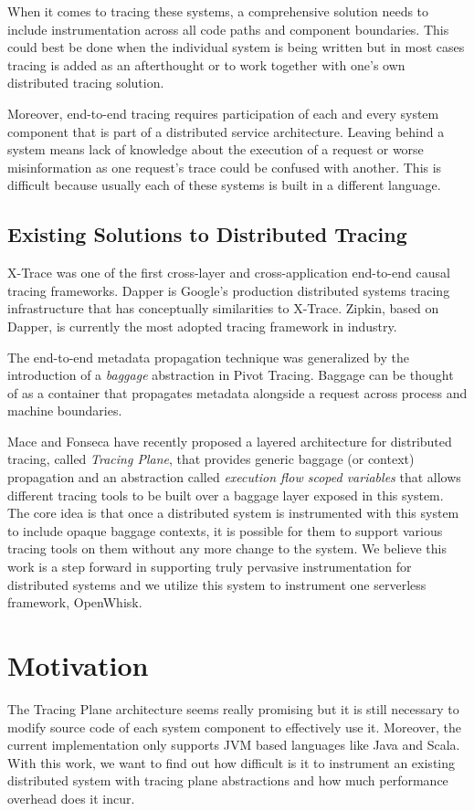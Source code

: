 When it comes to tracing these systems, a comprehensive solution needs to include instrumentation across all code paths and component boundaries. This could best be done when the individual system is being written but in most cases tracing is added as an afterthought or to work together with one's own distributed tracing solution.

Moreover, end-to-end tracing requires participation of each and every system component that is part of a distributed service architecture. Leaving behind a system means lack of knowledge about the execution of a request or worse misinformation as one request's trace could be confused with another. This is difficult because usually each of these systems is built in a different language.

\subsection{Existing Solutions to Distributed Tracing}
X-Trace\cite{Fonseca:2007:XPN:1973430.1973450} was one of the first cross-layer and cross-application end-to-end causal tracing frameworks. Dapper\cite{36356} is Google's production distributed systems tracing infrastructure that has conceptually similarities to X-Trace. Zipkin\cite{web:zipkin}, based on Dapper, is currently the most adopted tracing framework in industry\cite{mace2017survey}.

The end-to-end metadata propagation technique was generalized by the introduction of a \emph{baggage} abstraction in Pivot Tracing\cite{Mace:2015:PTD:2815400.2815415}. Baggage can be thought of as a container that propagates metadata alongside a request across process and machine boundaries.

Mace and Fonseca have recently proposed a layered architecture\cite{Mace17}\cite{Fonseca16} for distributed tracing, called \emph{Tracing Plane}, that provides generic baggage (or context) propagation and an abstraction called \emph{execution flow scoped variables} that allows different tracing tools to be built over a baggage layer exposed in this system. The core idea is that once a distributed system is instrumented with this system to include opaque baggage contexts, it is possible for them to support various tracing tools on them without any more change to the system. We believe this work is a step forward in supporting truly pervasive instrumentation for distributed systems and we utilize this system to instrument one serverless framework, OpenWhisk.


\section{Motivation}

The Tracing Plane architecture seems really promising but it is still necessary to modify source code of each system component to effectively use it. Moreover, the current implementation only supports JVM based languages like Java and Scala. With this work, we want to find out how difficult is it to instrument an existing distributed system with tracing plane abstractions and how much performance overhead does it incur.
